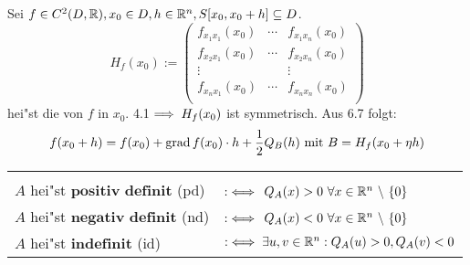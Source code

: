 \documentclass[a4paper,twoside,DIV15,BCOR12mm,chapterprefix=true,headings=twolinechapter]{scrbook}
\begin{document}
\begin{beispiel}
Sei $f\in C^2(D,\mathbb{R}),x_0\in D, h\in \mathbb{R}^n, S[x_0,x_0+h]\subseteq D$.
$$H_f(x_0):=\begin{pmatrix}
f_{x_1x_1}(x_0)&\cdots&f_{x_1x_n}(x_0)\\
f_{x_2x_1}(x_0)&\cdots&f_{x_2x_n}(x_0)\\
\vdots& &\vdots\\
f_{x_nx_1}(x_0)&\cdots&f_{x_nx_n}(x_0)\\
\end{pmatrix}$$
hei"st die  von $f$ in $x_0$. 4.1$\implies H_f(x_0)$ ist symmetrisch. Aus 6.7 folgt:
$$f(x_0+h)=f(x_0)+\mathop{\rm grad}\nolimits f(x_0)\cdot h + \frac{1}{2}Q_B(h)\text{ mit }B=H_f(x_0+\eta h)$$
\end{beispiel}
\begin{definition*}
\begin{tabular}{ll}
\\ %
\\
\index{Positivdefinitheit}
\index{Indefinitheit}
\index{Negativdefinitheit}
$A$ hei"st $\textbf{positiv definit}$ (pd) & $:\iff$ $Q_A(x)>0\ \forall x\in\MdR^n\ \backslash\ \{0\}$\\
$A$ hei"st $\textbf{negativ definit}$ (nd) & $:\iff$ $Q_A(x)<0\ \forall x\in\MdR^n\ \backslash\ \{0\}$\\
$A$ hei"st $\textbf{indefinit}$ (id) & $:\iff \exists u,v\in\mathbb{R}^n: Q_A(u)>0, Q_A(v)<0$
\end{tabular}
\end{definition*}
\end{document}
